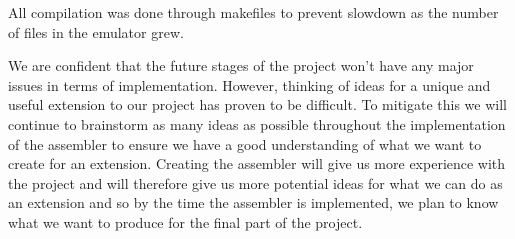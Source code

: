 \documentclass{article}
\begin{document}
All compilation was done through makefiles to prevent slowdown as the number of files in the emulator grew. \par
We are confident that the future stages of the project won't have any major issues in terms of implementation. However, thinking of ideas for a unique and useful extension to our project has proven to be difficult. To mitigate this we will continue to brainstorm as many ideas as possible throughout the implementation of the assembler to ensure we have a good understanding of what we want to create for an extension. Creating the assembler will give us more experience with the project and will therefore give us more potential ideas for what we can do as an extension and so by the time the assembler is implemented, we plan to know what we want to produce for the final part of the project.  
\end{document}
